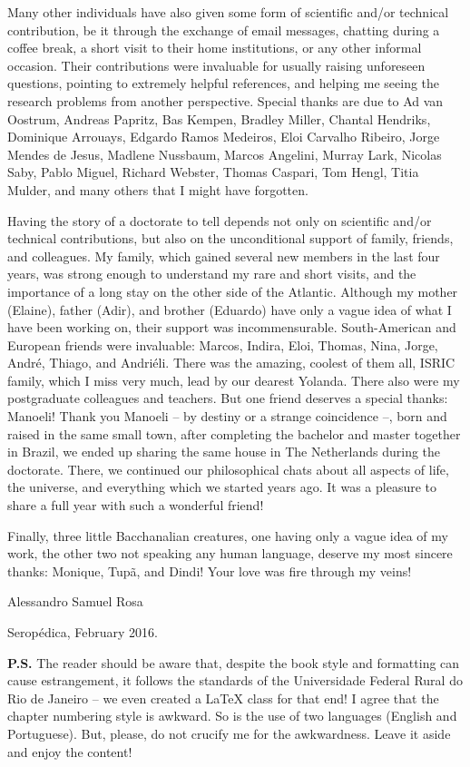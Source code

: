 Many other individuals have also given some form of scientific and/or technical contribution, be it through 
the exchange of email messages, chatting during a coffee break, a short visit to their home institutions, or 
any other informal occasion. Their contributions were invaluable for usually raising unforeseen questions, 
pointing to extremely helpful references, and helping me seeing the research problems from another perspective.
Special thanks are due to Ad van Oostrum, Andreas Papritz, Bas Kempen, Bradley Miller, Chantal Hendriks, 
Dominique Arrouays, Edgardo Ramos Medeiros, Eloi Carvalho Ribeiro, Jorge Mendes de Jesus, Madlene Nussbaum, 
Marcos Angelini, Murray Lark, Nicolas Saby, Pablo Miguel, Richard Webster, Thomas Caspari, Tom Hengl, Titia 
Mulder, and many others that I might have forgotten.

Having the story of a doctorate to tell depends not only on scientific and/or technical contributions,
but also on the unconditional support of family, friends, and colleagues. My family, which gained several new 
members in the last four years, was strong enough to understand my rare and short visits, and the importance 
of a long stay on the other side of the Atlantic. Although my mother (Elaine), father (Adir), and brother 
(Eduardo) have only a vague idea of what I have been working on, their support was incommensurable. 
South-American and European friends were invaluable: Marcos, Indira, Eloi, Thomas, Nina, Jorge, André, Thiago, 
and Andriéli. There was the amazing, coolest of them all, ISRIC family, which I miss very much, lead by 
our dearest Yolanda. There also were my postgraduate colleagues and teachers. But one friend deserves a special 
thanks: Manoeli! Thank you Manoeli -- by destiny or a strange coincidence --, born and raised in the same small 
town, after completing the bachelor and master together in Brazil, we ended up sharing the same house in The 
Netherlands during the doctorate. There, we continued our philosophical chats about all aspects of life, the 
universe, and everything which we started years ago. It was a pleasure to share a full year with such a 
wonderful friend!

Finally, three little Bacchanalian creatures, one having only a vague idea of my work, the other two not 
speaking any human language, deserve my most sincere thanks: Monique, Tupã, and Dindi! Your love was fire 
through my veins!

\begin{flushright}
 Alessandro Samuel Rosa
 
 Seropédica, February 2016.
\end{flushright}


\noindent
\textbf{P.S.} The reader should be aware that, despite the book style and formatting can cause estrangement, 
it follows the standards of the Universidade Federal Rural do Rio de Janeiro -- we even created a \LaTeX{} 
class for that end! I agree that the chapter numbering style is awkward. So is the use of two languages 
(English and Portuguese). But, please, do not crucify me for the awkwardness. Leave it aside and enjoy the 
content!
